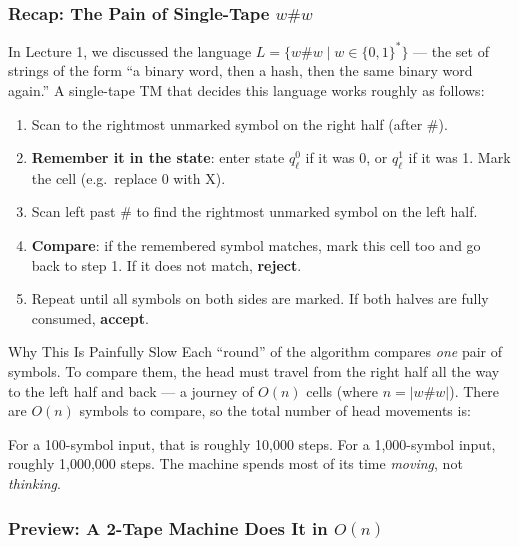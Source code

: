 \subsubsection{Recap: The Pain of Single-Tape $w\#w$}

In Lecture 1, we discussed the language $L = \{w\#w \mid w \in \{0,1\}^*\}$ --- the set of strings of the form ``a binary word, then a hash, then the same binary word again.'' A single-tape TM that decides this language works roughly as follows:

\begin{enumerate}[nosep]
\item Scan to the rightmost unmarked symbol on the right half (after $\#$).
\item \textbf{Remember it in the state}: enter state $q_\ell^0$ if it was 0, or $q_\ell^1$ if it was 1. Mark the cell (e.g.\ replace 0 with X).
\item Scan left past $\#$ to find the rightmost unmarked symbol on the left half.
\item \textbf{Compare}: if the remembered symbol matches, mark this cell too and go back to step 1. If it does not match, \textbf{reject}.
\item Repeat until all symbols on both sides are marked. If both halves are fully consumed, \textbf{accept}.
\end{enumerate}

\begin{conceptbox}{Why This Is Painfully Slow}
Each ``round'' of the algorithm compares \textit{one} pair of symbols. To compare them, the head must travel from the right half all the way to the left half and back --- a journey of $O(n)$ cells (where $n = |w\#w|$). There are $O(n)$ symbols to compare, so the total number of head movements is:


For a 100-symbol input, that is roughly 10{,}000 steps. For a 1{,}000-symbol input, roughly 1{,}000{,}000 steps. The machine spends most of its time \textit{moving}, not \textit{thinking}.

\end{conceptbox}

\subsubsection{Preview: A 2-Tape Machine Does It in $O(n)$}

